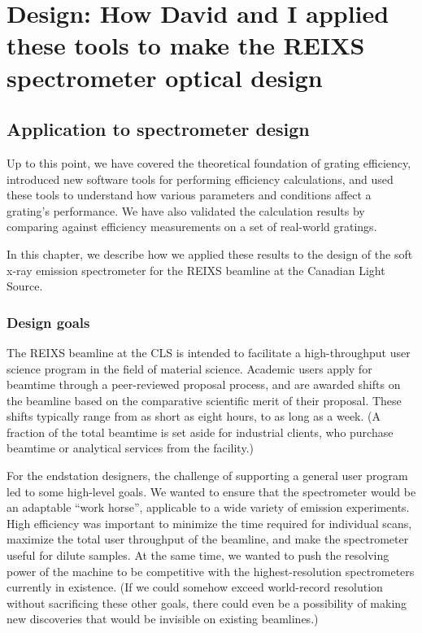 \chapter{Design: How David and I applied these tools to make the REIXS spectrometer optical design}
\section{Application to spectrometer design}
Up to this point, we have covered the theoretical foundation of grating efficiency, introduced new software tools for performing efficiency calculations, and used these tools to understand how various parameters and conditions affect a grating's performance.  We have also validated the calculation results by comparing against efficiency measurements on a set of  real-world gratings.

In this chapter, we describe how we applied these results to the design of the soft x-ray emission spectrometer for the REIXS beamline at the Canadian Light Source.

\subsection{Design goals}
The REIXS beamline at the CLS is intended to facilitate a high-throughput user science program in the field of material science.  Academic users apply for beamtime through a peer-reviewed proposal process, and are awarded shifts on the beamline based on the comparative scientific merit of their proposal.  These shifts typically range from as short as eight hours, to as long as a week.  (A fraction of the total beamtime is set aside for industrial clients, who purchase beamtime or analytical services from the facility.)

For the endstation designers, the challenge of supporting a general user program led to some high-level goals.  We wanted to ensure that the spectrometer would be an adaptable ``work horse'', applicable to a wide variety of emission experiments.  High efficiency was important to minimize the time required for individual scans, maximize the total user throughput of the beamline, and make the spectrometer useful for dilute samples.  At the same time, we wanted to push the resolving power of the machine to be competitive with the highest-resolution spectrometers currently in existence.  (If we could somehow exceed world-record resolution without sacrificing these other goals, there could even be a possibility of making new discoveries that would be invisible on existing beamlines.)

